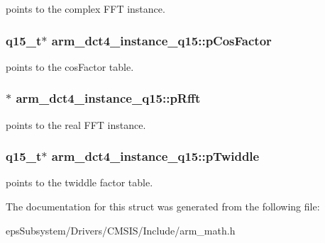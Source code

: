 points to the complex F\-F\-T instance. \hypertarget{structarm__dct4__instance__q15_ac76df681b1bd502fb4874c06f055dded}{
\subsubsection[{p\-Cos\-Factor}]{\setlength{\rightskip}{0pt plus 5cm}q15\-\_\-t$\ast$ arm\-\_\-dct4\-\_\-instance\-\_\-q15\-::p\-Cos\-Factor}}\label{structarm__dct4__instance__q15_ac76df681b1bd502fb4874c06f055dded}
points to the cos\-Factor table. \hypertarget{structarm__dct4__instance__q15_a11cf95c1cd9dd2dd5e4b81b8f88dc208}{
\subsubsection[{p\-Rfft}]{$\ast$ arm\-\_\-dct4\-\_\-instance\-\_\-q15\-::p\-Rfft}}\label{structarm__dct4__instance__q15_a11cf95c1cd9dd2dd5e4b81b8f88dc208}
points to the real F\-F\-T instance. \hypertarget{structarm__dct4__instance__q15_abc6c847e9f906781e1d5da40e9aafa76}{
\subsubsection[{p\-Twiddle}]{\setlength{\rightskip}{0pt plus 5cm}q15\-\_\-t$\ast$ arm\-\_\-dct4\-\_\-instance\-\_\-q15\-::p\-Twiddle}}\label{structarm__dct4__instance__q15_abc6c847e9f906781e1d5da40e9aafa76}
points to the twiddle factor table. 

The documentation for this struct was generated from the following file\-:\begin{DoxyCompactItemize}
\item 
eps\-Subsystem/\-Drivers/\-C\-M\-S\-I\-S/\-Include/arm\-\_\-math.\-h\end{DoxyCompactItemize}
